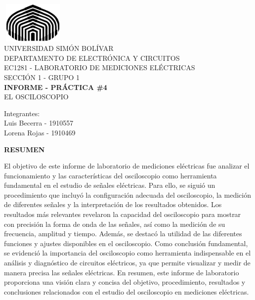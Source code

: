 \documentclass[12pt]{article}
\begin{document}
	
	\thispagestyle{empty}
	
	\begin{center}
		\includegraphics[width=3.1cm,height=2cm]{logo}\\
		UNIVERSIDAD SIMÓN BOLÍVAR\\
		DEPARTAMENTO DE ELECTRÓNICA Y CIRCUITOS\\
		EC1281 - LABORATORIO DE MEDICIONES ELÉCTRICAS\\
		SECCIÓN 1 - GRUPO 1\\
		
		\vspace{7cm}
		\textbf{\Large INFORME - PRÁCTICA \#4}\\
		EL OSCILOSCOPIO\\
	\end{center}
	
	\begin{flushleft}
		\vspace{9cm}
		\hfill Integrantes:\\
		\hfill {\large Luis Becerra - 1910557}\\
		\hfill {\large Lorena Rojas - 1910469}\\
	\end{flushleft}
	
	\newpage
	
        \setcounter{page}{2}
	
	\begin{center}
		\textbf{\large RESUMEN}\\
	\end{center}
	
        El objetivo de este informe de laboratorio de mediciones eléctricas fue analizar el funcionamiento y las características del osciloscopio como herramienta fundamental en el estudio de señales eléctricas. Para ello, se siguió un procedimiento que incluyó la configuración adecuada del osciloscopio, la medición de diferentes señales y la interpretación de los resultados obtenidos. Los resultados más relevantes revelaron la capacidad del osciloscopio para mostrar con precisión la forma de onda de las señales, así como la medición de su frecuencia, amplitud y tiempo. Además, se destacó la utilidad de las diferentes funciones y ajustes disponibles en el osciloscopio. Como conclusión fundamental, se evidenció la importancia del osciloscopio como herramienta indispensable en el análisis y diagnóstico de circuitos eléctricos, ya que permite visualizar y medir de manera precisa las señales eléctricas. En resumen, este informe de laboratorio proporciona una visión clara y concisa del objetivo, procedimiento, resultados y conclusiones relacionados con el estudio del osciloscopio en mediciones eléctricas.\\
	
\end{document}
